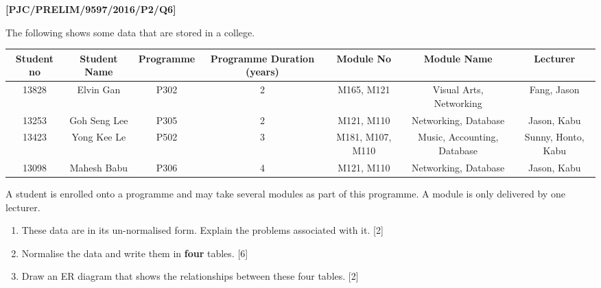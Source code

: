 \item \textbf{{[}PJC/PRELIM/9597/2016/P2/Q6{]} }

The following shows some data that are stored in a college. 
\noindent \begin{center}
\begin{tabular}{|c|c|c|c|c|c|c|}
\hline 
Student no & Student Name & Programme & Programme Duration (years) & Module No & Module Name & Lecturer\tabularnewline
\hline 
\hline 
13828 & Elvin Gan & P302 & 2 & M165, M121 & Visual Arts, Networking & Fang, Jason\tabularnewline
\hline 
13253 & Goh Seng Lee & P305 & 2 & M121, M110 & Networking, Database & Jason, Kabu\tabularnewline
\hline 
13423 & Yong Kee Le & P502 & 3 & M181, M107, M110 & Music, Accounting, Database & Sunny, Honto, Kabu\tabularnewline
\hline 
13098 & Mahesh Babu & P306 & 4 & M121, M110 & Networking, Database & Jason, Kabu \tabularnewline
\hline 
\end{tabular} 
\par\end{center}

A student is enrolled onto a programme and may take several modules
as part of this programme. A module is only delivered by one lecturer.
\begin{enumerate}
\item These data are in its un-normalised form. Explain the problems associated
with it. \hfill{}{[}2{]}
\item Normalise the data and write them in \textbf{four} tables. \hfill{}{[}6{]}
\item Draw an ER diagram that shows the relationships between these four
tables. \hfill{} {[}2{]}
\end{enumerate}